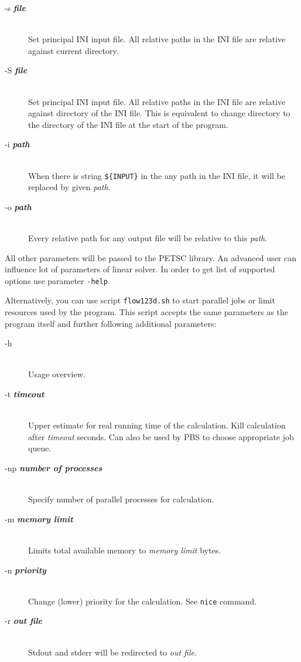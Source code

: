 \documentclass[12pt,a4paper]{report}
\begin{document}
\begin{description}
 \item[-s {\bf\it file}] \hfill\\
 	 Set principal INI input file. All relative paths in the INI file are relative against current directory.
 \item[-S {\bf\it file}] \hfill\\
 	Set principal INI input file. All relative paths in the INI file are relative against directory of the INI file. This is equivalent
to change directory to the directory of the INI file at the start of the program.
 \item[-i {\bf\it path}] \hfill\\
 	When there is string \verb"${INPUT}" %
  	in the any path in the INI file, it will be replaced by given {\it path}.
 \item[-o {\bf\it path}] \hfill\\
 	Every relative path for any output file will be relative to this {\it path}. 
\end{description}

All other parameters will be passed to the PETSC library. An advanced user can influence lot of parameters of linear solver. In order to get list of supported options 
use parameter \verb'-help'.


Alternatively, you can use script \verb'flow123d.sh' to start parallel jobs or limit resources used by the program. This script accepts the same parameters as the program itself
and further following additional parameters:

\begin{description}
  \item[-h] \hfill\\
  	Usage overview.
  \item[-t {\bf\it timeout}] \hfill\\
  	Upper estimate for real running time of the calculation. Kill calculation after {\it timeout} seconds. 
  	Can also be used by PBS to choose appropriate job queue. 
  \item[-np {\bf\it number of processes}] \hfill\\
  	Specify number of parallel processes for calculation.
  \item[-m {\bf\it memory limit}] \hfill\\
  	Limits total available memory to {\it memory limit} bytes.
  \item[-n {\bf\it priority}] \hfill\\
  	Change (lower) priority for the calculation. See {\tt nice} command.
  \item[-r {\bf\it out file}] \hfill\\
  	Stdout and stderr will be redirected to {\it out file}.
\end{description}
\end{document}
